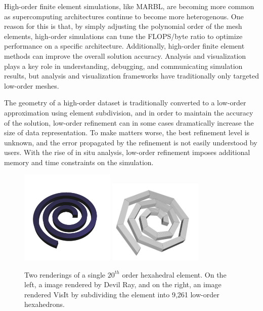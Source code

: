 High-order finite element simulations, like MARBL, are becoming more
common as supercomputing architectures continue to become more
heterogenous.
%
One reason for this is that, by simply adjusting the polynomial order
of the mesh elements, high-order simulations
can tune the FLOPS/byte ratio to optimize performance on a specific architecture.
%
Additionally, high-order finite element methods can improve the overall solution accuracy.
%
Analysis and visualization plays a key role in understanding, debugging,
and communicating simulation results, but analysis and visualization frameworks
have traditionally only targeted low-order meshes.
%

The geometry of a high-order dataset is traditionally converted
to a low-order approximation using element subdivision, and in order
to maintain the accuracy of the solution, low-order refinement can
in some cases dramatically increase the size of data representation.
%
To make matters worse, the best refinement level is unknown,
and the error propagated by the refinement is not easily understood by users.
%
With the rise of in situ analysis, low-order refinement imposes additional memory
and time constraints on the simulation.
%

\begin{figure}
\centering
\includegraphics[width=0.4\textwidth]{images/dray_crazy}
\includegraphics[width=0.4\textwidth]{images/visit_crazy}
\caption{\label{img:crazy_hex} Two renderings of a single $20^{th}$ order hexahedral element.
On the left, a image rendered by Devil Ray, and on the right, an image rendered VisIt by subdividing the element into
9,261 low-order hexahedrons.}
\end{figure}


